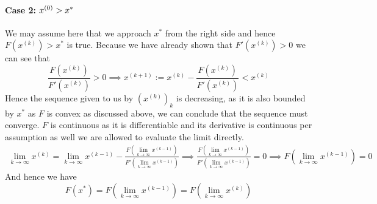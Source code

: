 \documentclass{article}
\begin{document}
\paragraph{Case 2: $x^{\left(0\right)} > x^{*}\newline$}
We may assume here that we approach $x^{*}$ from the right side and hence $F\left(x^{\left(k\right)}\right) > x^{*}$ is true. Because we have already shown that $F'\left(x^{\left(k\right)}\right) > 0$ we can see that 
\begin{equation*}
    \frac{F\left(x^{\left(k\right)}\right)}{F'\left(x^{\left(k\right)}\right)} > 0 \implies x^{\left(k+1\right)} := x^{\left(k\right)} - \frac{F\left(x^{\left(k\right)}\right)}{F'\left(x^{\left(k\right)}\right)} < x^{\left(k\right)}
\end{equation*}
Hence the sequence given to us by $\left(x^{\left(k\right)}\right)_{k}$ is decreasing, as it is also bounded by $x^{*}$ as $F$ is convex as discussed above, we can conclude that the sequence must converge. $F$ is continuous as it is differentiable and its derivative is continuous per assumption as well we are allowed to evaluate the limit directly.
\begin{align*}
    \lim_{k \to \infty}x^{\left(k\right)} = \lim_{k \to \infty} x^{\left(k-1\right)} - \frac{F\left(\lim_{k \to \infty}x^{\left(k-1\right)}\right)}{F'\left(\lim_{k \to \infty}x^{\left(k-1\right)}\right)} \implies \frac{F\left(\lim_{k \to \infty}x^{\left(k-1\right)}\right)}{F'\left(\lim_{k \to \infty}x^{\left(k-1\right)}\right)} = 0 \implies F\left(\lim_{k \to \infty}x^{\left(k-1\right)}\right) = 0
\end{align*}
And hence we have
\begin{equation*}
    F\left(x^{*}\right) = F\left(\lim_{k \to \infty}x^{\left(k-1\right)}\right) = F\left(\lim_{k \to \infty}x^{\left(k\right)}\right)
\end{equation*}
\end{document}
